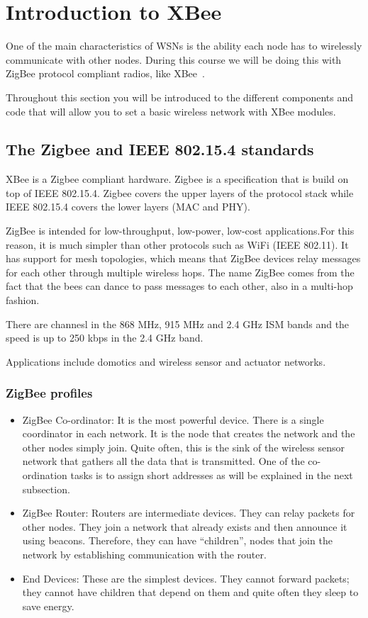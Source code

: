 \chapter{Introduction to XBee}\label{introToXBee}


One of the main characteristics of WSNs is the ability each node has to wirelessly communicate with other nodes. 
During this course we will be doing this with ZigBee protocol compliant radios, like XBee~\cite{faludi2010bws}.

Throughout this section you will be introduced to the different components and code that will allow you to set a basic wireless network with XBee modules.

\section{The Zigbee and IEEE 802.15.4 standards}

XBee is a Zigbee compliant hardware.
Zigbee is a specification that is build on top of IEEE 802.15.4.
Zigbee covers the upper layers of the protocol stack while IEEE 802.15.4 covers the lower layers (MAC and PHY).

ZigBee is intended for low-throughput, low-power, low-cost applications.For this reason, it is much simpler than other protocols such as WiFi (IEEE 802.11).
It has support for mesh topologies, which means that ZigBee devices relay messages for each other through multiple wireless hops.
The name ZigBee comes from the fact that the bees can dance to pass messages to each other, also in a multi-hop fashion.

There are channesl in the 868 MHz, 915 MHz and 2.4 GHz ISM bands and the speed is up to 250 kbps in the 2.4 GHz band.

Applications include domotics and wireless sensor and actuator networks.

\subsection{ZigBee profiles}
\begin{itemize}
\item ZigBee Co-ordinator: It is the most powerful device. There is a single coordinator in each network.
It is the node that creates the network and the other nodes simply join.
Quite often, this is the sink of the wireless sensor network that gathers all the data that is transmitted.
One of the co-ordination tasks is to assign short addresses as will be explained in the next subsection.
\item ZigBee Router: Routers are intermediate devices.
They can relay packets for other nodes.
They join a network that already exists and then announce it using beacons.
Therefore, they can have ``children'', nodes that join the network by establishing communication with the router.
\item End Devices:
These are the simplest devices.
They cannot forward packets; they cannot have children that depend on them and quite often they sleep to save energy.
\end{itemize}

